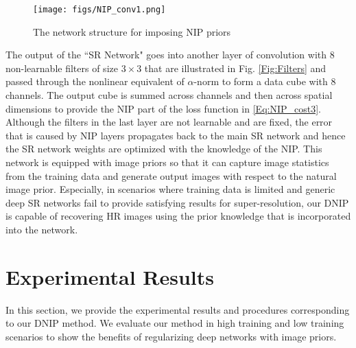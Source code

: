 \documentclass[9pt]{article}
\begin{document}
\begin{figure}
  \centering
  \texttt{[image: figs/NIP\_conv1.png]}\vspace{-0.15in}
  \caption{The network structure for imposing NIP priors}
  \label{fig:NIP_network}
\end{figure}

The output of the ``SR Network" goes into another layer of convolution with 8 non-learnable filters of size $3\times 3$ that are illustrated in Fig. \ref{Fig:Filters} and passed through the nonlinear equivalent of $\alpha$-norm to form a data cube with 8 channels. The output cube is summed across channels and then across spatial dimensions to provide the NIP part of the loss function in \eqref{Eq:NIP_cost3}. %
Although the filters in the last layer are not learnable and are fixed, the error that is caused by NIP layers propagates back to the main SR network and hence the SR network weights are optimized with the knowledge of the NIP.
This network is equipped with image priors so that it can capture image statistics from the training data and generate output images with respect to the natural image prior. Especially, in scenarios where training data is limited and generic deep SR networks fail to provide satisfying results for super-resolution, our DNIP is capable of recovering HR images using the prior knowledge that is incorporated into the network. %





\section{Experimental Results}
In this section, we provide the experimental results and procedures corresponding to our DNIP method. We evaluate our method in high training and low training scenarios to show the benefits of regularizing deep networks with image priors.
\end{document}
